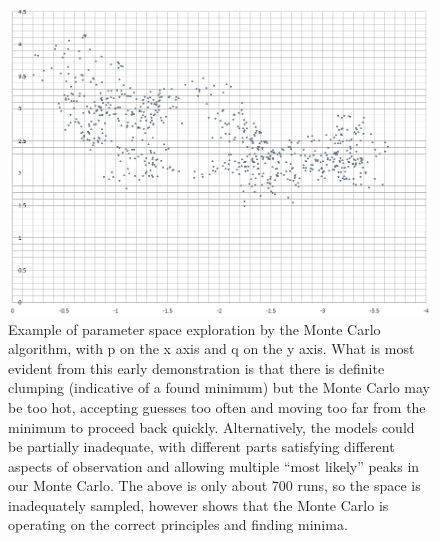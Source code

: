 \documentclass[twocolumn,letterpaper,10pt]{article}
\begin{document}
\begin{onecolumn}
\begin{figure}
\includegraphics[width=\textwidth]{MCTest}
\caption{Example of parameter space exploration by the Monte Carlo algorithm, with p on the x axis and q on the y axis. What is most evident from this early demonstration is that there is definite clumping (indicative of a found minimum) but the Monte Carlo may be too hot, accepting guesses too often and moving too far from the minimum to proceed back quickly. Alternatively, the models could be partially inadequate, with different parts satisfying different aspects of observation and allowing multiple ``most likely'' peaks in our Monte Carlo. The above is only about 700 runs, so the space is inadequately sampled, however shows that the Monte Carlo is operating on the correct principles and finding minima.}
\label{fig:mc}
\end{figure}


\end{onecolumn}
\end{document}
